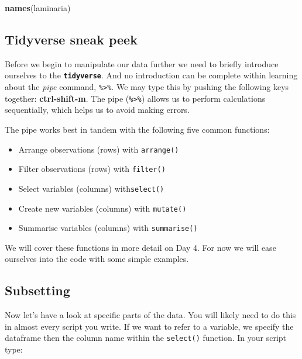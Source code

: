 \documentclass[]{book}
\newenvironment{Shaded}{\begin{snugshade}}{\end{snugshade}}
\newcommand{\KeywordTok}[1]{\textcolor[rgb]{0.13,0.29,0.53}{\textbf{#1}}}
\newcommand{\NormalTok}[1]{#1}
\providecommand{\tightlist}{%
  \setlength{\itemsep}{0pt}\setlength{\parskip}{0pt}}
\theoremstyle{definition}
\theoremstyle{definition}
\theoremstyle{definition}
\theoremstyle{remark}
\begin{document}
\begin{Shaded}
\begin{Highlighting}[]
\KeywordTok{names}\NormalTok{(laminaria)}
\end{Highlighting}
\end{Shaded}

\subsection{Tidyverse sneak peek}\label{tidyverse-sneak-peek}

Before we begin to manipulate our data further we need to briefly
introduce ourselves to the \textbf{\texttt{tidyverse}}. And no
introduction can be complete within learning about the \emph{pipe}
command, \texttt{\%\textgreater{}\%}. We may type this by pushing the
following keys together: \textbf{ctrl-shift-m}. The pipe
(\texttt{\%\textgreater{}\%}) allows us to perform calculations
sequentially, which helps us to avoid making errors.

The pipe works best in tandem with the following five common functions:

\begin{itemize}
\tightlist
\item
  Arrange observations (rows) with \texttt{arrange()}\\
\item
  Filter observations (rows) with \texttt{filter()}\\
\item
  Select variables (columns) with\texttt{select()}\\
\item
  Create new variables (columns) with \texttt{mutate()}\\
\item
  Summarise variables (columns) with \texttt{summarise()}
\end{itemize}

We will cover these functions in more detail on Day 4. For now we will
ease ourselves into the code with some simple examples.

\subsection{Subsetting}\label{subsetting}

Now let's have a look at specific parts of the data. You will likely
need to do this in almost every script you write. If we want to refer to
a variable, we specify the dataframe then the column name within the
\texttt{select()} function. In your script type:
\end{document}
